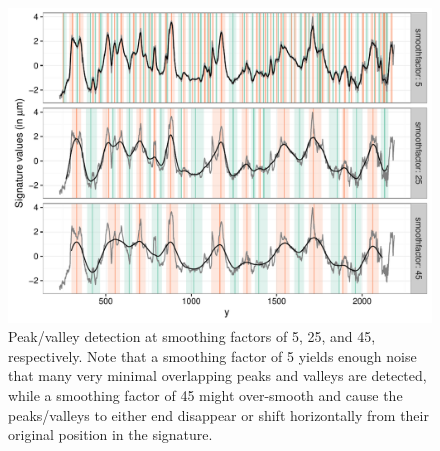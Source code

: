 \documentclass[aoas, preprint]{imsart}\usepackage[]{graphicx}\usepackage[]{color}
\newenvironment{knitrout}{}{} %
\begin{document}
\begin{figure}[hbtp]
  \centering
\begin{knitrout}
\color{fgcolor}
\includegraphics[width=.5\textwidth]{smoothfac1-1} 

\end{knitrout}
\caption{\label{fig:varysmooth} Peak/valley detection at smoothing factors of 5, 25, and 45, respectively. Note that a smoothing factor of 5 yields enough noise that many very minimal overlapping peaks and valleys are detected, while a smoothing factor of 45 might over-smooth and cause the peaks/valleys to either end disappear or shift  horizontally from their original position in the signature.}
\end{figure}
\end{document}
